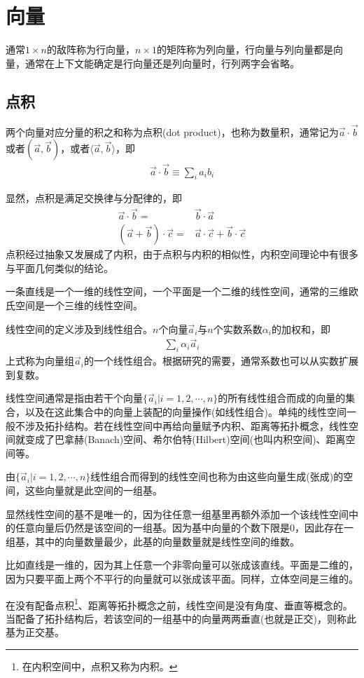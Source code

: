 \section{向量}
\label{sec:vector}

通常$1\times n$的敌阵称为行向量，$n\times 1$的矩阵称为列向量，行向量与列向量都是向量，通常在上下文能确定是行向量还是列向量时，行列两字会省略。

\subsection{点积}
\label{sec:dot-product-of-vector}
\begin{definition}
  两个向量对应分量的积之和称为点积(dot product)，也称为数量积，通常记为$\vec a\cdot\vec b$或者$(\vec a,\vec b)$，或者$\langle\vec a,\vec b\rangle$，即
  \begin{align*}
    \vec{a}\cdot \vec b\equiv\sum_i a_ib_i
  \end{align*}
\end{definition}

显然，点积是满足交换律与分配律的，即
\begin{align*}
  \vec a\cdot \vec b={}&\vec b\cdot \vec a\\
  (\vec a + \vec b)\cdot \vec c ={}& \vec a\cdot \vec c + \vec b\cdot \vec c
\end{align*}
点积经过抽象又发展成了内积，由于点积与内积的相似性，内积空间理论中有很多与平面几何类似的结论。

\begin{example}
  一条直线是一个一维的线性空间，一个平面是一个二维的线性空间，通常的三维欧氏空间是一个三维的线性空间。

  线性空间的定义涉及到线性组合。$n$个向量$\vec a_i$与$n$个实数系数$\alpha_i$的加权和，即
  \begin{align*}
    \sum_i \alpha_i \vec a_i
  \end{align*}
  上式称为向量组$\vec a_i$的一个线性组合。根据研究的需要，通常系数也可以从实数扩展到复数。

  线性空间通常是指由若干个向量$\{\vec a_i|i=1,2,\cdots,n\}$的所有线性组合而成的向量的集合，以及在这此集合中的向量上装配的向量操作(如线性组合)。单纯的线性空间一般不涉及拓扑结构。若在线性空间中再给向量赋予内积、距离等拓扑概念，线性空间就变成了巴拿赫(Banach)空间、希尔伯特(Hilbert)空间(也叫内积空间)、距离空间等。

  由$\{\vec a_i|i=1,2,\cdots,n\}$线性组合而得到的线性空间也称为由这些向量生成(张成)的空间，这些向量就是此空间的一组基。

  显然线性空间的基不是唯一的，因为往任意一组基里再额外添加一个该线性空间中的任意向量后仍然是该空间的一组基。因为基中向量的个数下限是0，因此存在一组基，其中的向量数量最少，此基的向量数量就是线性空间的维数。

  比如直线是一维的，因为其上任意一个非零向量可以张成该直线。平面是二维的，因为只要平面上两个不平行的向量就可以张成该平面。同样，立体空间是三维的。

  在没有配备点积\footnote{在内积空间中，点积又称为内积。}、距离等拓扑概念之前，线性空间是没有角度、垂直等概念的。当配备了拓扑结构后，若该空间的一组基中的向量两两垂直(也就是正交)，则称此基为正交基。
\end{example}

